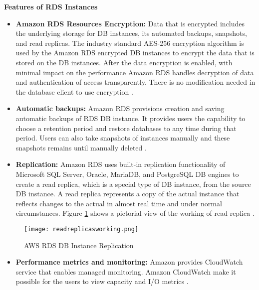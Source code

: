 \textbf{Features of RDS Instances}
\begin{itemize}
    \item \textbf{Amazon RDS Resources Encryption:} Data that is encrypted includes the underlying storage for DB instances, its automated backups, snapshots, and read replicas.
    The industry standard AES-256 encryption algorithm is used by the Amazon RDS encrypted DB instances to encrypt the data that is stored on the DB instances.
    After the data encryption is enabled, with minimal impact on the performance Amazon RDS handles decryption of data and authentication of access transparently.
    There is no modification needed in the database client to use encryption \cite{37}.
\end{itemize}
\begin{itemize}
    \item \textbf{Automatic backups:} Amazon RDS provisions creation and saving automatic backups of RDS DB instance.
    It
    provides users the capability to choose a retention
    period and restore databases to any time during that period.
    Users can also take snapshots of instances manually and these snapshots remains until manually deleted \cite{37}.
\end{itemize}
\begin{itemize}
    \item \textbf{Replication:} Amazon RDS uses built-in
    replication functionality of Microsoft SQL Server, Oracle, MariaDB, and PostgreSQL DB engines to create a read replica, which is a special type of DB instance, from the source DB instance.
    A read replica represents a copy of the actual instance that reflects changes to the actual in almost real time and under normal circumstances.
    Figure \ref{fig:readreplicasworking} shows a pictorial view of the working of read replica \cite{37}.
\end{itemize}
\begin{figure}
    \centering
    \texttt{[image: readreplicasworking.png]}
    \caption{AWS RDS DB Instance Replication}{\cite{38}}
    \label{fig:readreplicasworking}
\end{figure}
\begin{itemize}
    \item \textbf{Performance metrics and monitoring:} Amazon provides CloudWatch service that enables managed
    monitoring.
    Amazon CloudWatch make it possible for the users to
    view capacity and I/O metrics \cite{37}.
\end{itemize}



